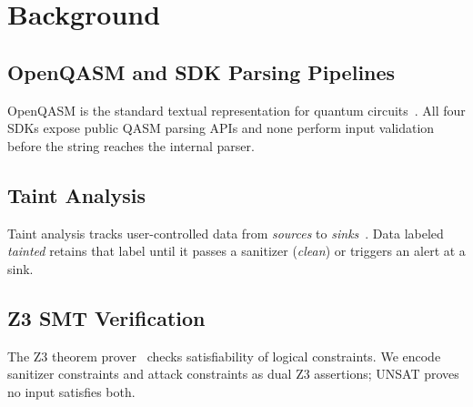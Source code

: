 \documentclass[conference,compsoc]{IEEEtran}
\begin{document}
\section{Background}
\label{sec:background}
\subsection{OpenQASM and SDK Parsing Pipelines}
\noindent OpenQASM is the standard textual representation for quantum
circuits~\cite{cross2017open,cross2022openqasm3}.
All four SDKs expose public QASM parsing APIs and none perform input
validation before the string reaches the internal parser.

\subsection{Taint Analysis}
\noindent Taint analysis tracks user-controlled data from \emph{sources} to
\emph{sinks}~\cite{newsome2005dynamic}.
Data labeled \emph{tainted} retains that label until it passes a
sanitizer (\emph{clean}) or triggers an alert at a sink.

\subsection{Z3 SMT Verification}
\noindent The Z3 theorem prover~\cite{demoura2008z3} checks satisfiability of
logical constraints.
We encode sanitizer constraints and attack constraints as dual Z3
assertions; UNSAT proves no input satisfies both.
\end{document}
